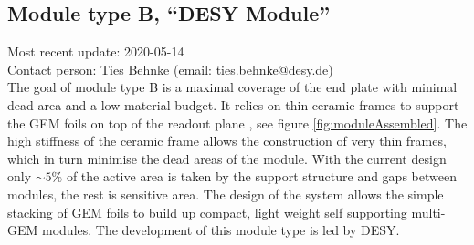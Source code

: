 \subsection{Module type B, ``DESY Module''}
\label{chap:TPC_sec:DESY_gems}
Most recent update: 2020-05-14 \\
Contact person: Ties Behnke (email: ties.behnke@desy.de)\\

The goal of module type B is a maximal coverage of the end plate with minimal dead area and a low material budget. It relies on thin ceramic frames to support the GEM foils on top of the readout plane \cite{Hallermann:2010zz,2012arXiv1202.6510D}, see figure \ref{fig:moduleAssembled}. The high stiffness of the ceramic frame allows the construction of very thin frames, which in turn minimise the dead areas of the module. With the current design only $\sim5\%$ of the active area is taken by the support structure and gaps between modules, the rest is sensitive area. The design of the system allows the simple stacking of GEM foils to build up compact, light weight self supporting multi-GEM modules. The development of this module type is led by DESY.

